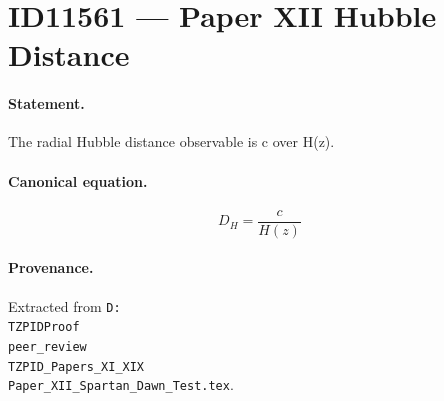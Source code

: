 \section*{ID11561 --- Paper XII Hubble Distance}

\paragraph{Statement.}
The radial Hubble distance observable is c over H(z).

\paragraph{Canonical equation.}
\[
D_H=\frac{c}{H(z)}
\]

\paragraph{Provenance.}
Extracted from \texttt{D:\\TZPIDProof\\peer\_review\\TZPID\_Papers\_XI\_XIX\\Paper\_XII\_Spartan\_Dawn\_Test.tex}.
